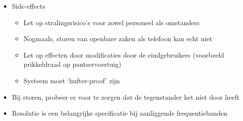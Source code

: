 \documentclass[12pt, a4paper]{article}
\begin{document}
\begin{itemize}
    \item Side-effects
    \begin{itemize}
        \item Let op stralingsrisico's voor zowel personeel als omstanders
        \item Nogmaals, storen van openbare zaken als telefoon kan echt niet
        \item Let op effecten door modificaties door de eindgebruikers (voorbeeld prikkeldraad op pantservoertuig)
        \item Systeem moet `hufter-proof' zijn
    \end{itemize}

    \item Bij storen, probeer er voor te zorgen dat de tegenstander het niet door heeft
    \item Resolutie is een belangrijke specificatie bij aanliggende frequentiebanden
\end{itemize}
\end{document}
